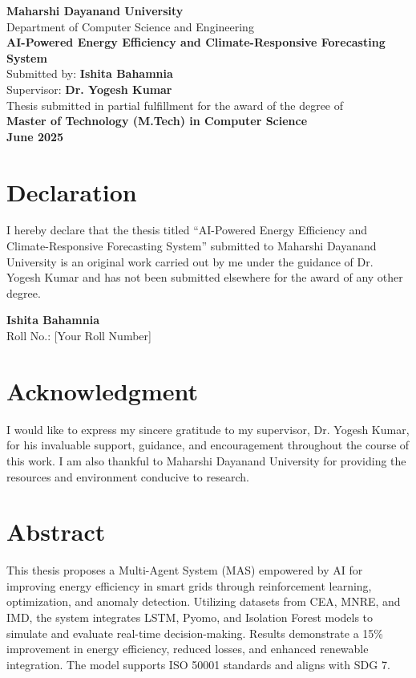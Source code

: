 \documentclass[12pt,a4paper]{report}
\begin{document}
\begin{titlepage}
\centering
{\Large \textbf{Maharshi Dayanand University}}\\[1cm]
{\Large Department of Computer Science and Engineering}\\[2cm]
{\Huge \textbf{AI-Powered Energy Efficiency and Climate-Responsive Forecasting System}}\\[2cm]
{\Large Submitted by: \textbf{Ishita Bahamnia}}\\[0.5cm]
{\Large Supervisor: \textbf{Dr. Yogesh Kumar}}\\[4cm]
{\large Thesis submitted in partial fulfillment for the award of the degree of}\\[0.5cm]
{\Large \textbf{Master of Technology (M.Tech) in Computer Science}}\\[3cm]
{\Large \textbf{June 2025}}\\
\end{titlepage}

\chapter*{Declaration}
I hereby declare that the thesis titled “AI-Powered Energy Efficiency and Climate-Responsive Forecasting System” submitted to Maharshi Dayanand University is an original work carried out by me under the guidance of Dr. Yogesh Kumar and has not been submitted elsewhere for the award of any other degree.

\vspace{1cm}
\begin{flushright}
\textbf{Ishita Bahamnia}\\
Roll No.: [Your Roll Number]
\end{flushright}

\chapter*{Acknowledgment}
I would like to express my sincere gratitude to my supervisor, Dr. Yogesh Kumar, for his invaluable support, guidance, and encouragement throughout the course of this work. I am also thankful to Maharshi Dayanand University for providing the resources and environment conducive to research.

\chapter*{Abstract}
This thesis proposes a Multi-Agent System (MAS) empowered by AI for improving energy efficiency in smart grids through reinforcement learning, optimization, and anomaly detection. Utilizing datasets from CEA, MNRE, and IMD, the system integrates LSTM, Pyomo, and Isolation Forest models to simulate and evaluate real-time decision-making. Results demonstrate a 15\% improvement in energy efficiency, reduced losses, and enhanced renewable integration. The model supports ISO 50001 standards and aligns with SDG 7.
\end{document}

